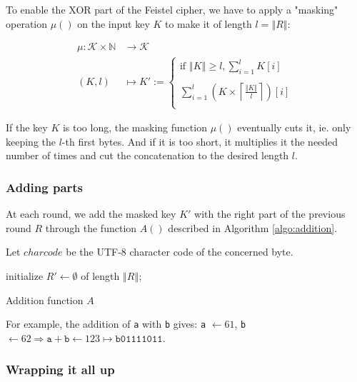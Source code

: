 \documentclass[twoside,twocolumn]{article}
\newcommand{\ceil}[1]{\left\lceil #1 \right\rceil}
\newcommand{\norm}[1]{\left\Vert#1\right\Vert}
\theoremstyle{definition}
\theoremstyle{remark}
\begin{document}
To enable the XOR part of the Feistel cipher, we have to apply a "masking" operation $\mu()$ on the input key $K$ to make it of length $l = \norm{R}$:
\begin{small}
    \begin{equation}
        \label{eq:masking}
        \begin{array}{rl}
            \mu: \mathcal{K} \times \mathbb{N} &\to \mathcal{K} \\
            (K, l) &\mapsto K' := \left\{
                \begin{array}{l}
                    \textrm{if } \norm{K} \geq l, \sum_{i=1}^l K[i] \\ \\
                    \sum_{i=1}^l (K \times \ceil{\frac{\norm{K}}{l}})[i] \\
                \end{array}
            \right.
        \end{array}
    \end{equation}
\end{small}
If the key $K$ is too long, the masking function $\mu()$ eventually cuts it, ie. only keeping the $l$-th first bytes.
And if it is too short, it multiplies it the needed number of times and cut the concatenation to the desired length $l$.

\subsubsection{Adding parts}

At each round, we add the masked key $K'$ with the right part of the previous round $R$ through the function $A()$ described in Algorithm 
\ref{algo:addition}.

Let $charcode$ be the UTF-8 character code of the concerned byte.
\begin{algorithm}
    \KwIn{$R$, $K' \gets \mu(K, \norm{R})$}
    initialize $R' \gets \emptyset$ of length $\norm{R}$; \\
    \caption{Addition function $A$}
    \label{algo:addition}
\end{algorithm}

For example, the addition of \texttt{a} with \texttt{b} gives:
\texttt{a} $\gets 61$,  \texttt{b} $\gets 62 \Rightarrow \texttt{a} + \texttt{b} \gets 123 \mapsto \texttt{b01111011}$.

\subsubsection{Wrapping it all up}
\end{document}
